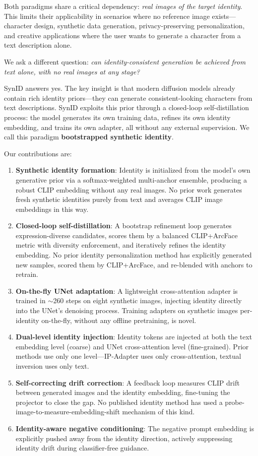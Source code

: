 \documentclass[10pt,twocolumn]{article}
\begin{document}
Both paradigms share a critical dependency: \textit{real images of the target identity}. This limits their applicability in scenarios where no reference image exists---character design, synthetic data generation, privacy-preserving personalization, and creative applications where the user wants to generate a character from a text description alone.

We ask a different question: \textit{can identity-consistent generation be achieved from text alone, with no real images at any stage?}

SynID answers yes. The key insight is that modern diffusion models already contain rich identity priors---they can generate consistent-looking characters from text descriptions. SynID exploits this prior through a closed-loop self-distillation process: the model generates its own training data, refines its own identity embedding, and trains its own adapter, all without any external supervision. We call this paradigm \textbf{bootstrapped synthetic identity}.

Our contributions are:
\begin{enumerate}[leftmargin=*,topsep=2pt,itemsep=1pt]
    \item \textbf{Synthetic identity formation}: Identity is initialized from the model's own generative prior via a softmax-weighted multi-anchor ensemble, producing a robust CLIP embedding without any real images. No prior work generates fresh synthetic identities purely from text and averages CLIP image embeddings in this way.
    \item \textbf{Closed-loop self-distillation}: A bootstrap refinement loop generates expression-diverse candidates, scores them by a balanced CLIP+ArcFace metric with diversity enforcement, and iteratively refines the identity embedding. No prior identity personalization method has explicitly generated new samples, scored them by CLIP+ArcFace, and re-blended with anchors to retrain.
    \item \textbf{On-the-fly UNet adaptation}: A lightweight cross-attention adapter is trained in $\sim$260 steps on eight synthetic images, injecting identity directly into the UNet's denoising process. Training adapters on synthetic images per-identity on-the-fly, without any offline pretraining, is novel.
    \item \textbf{Dual-level identity injection}: Identity tokens are injected at both the text embedding level (coarse) and UNet cross-attention level (fine-grained). Prior methods use only one level---IP-Adapter uses only cross-attention, textual inversion uses only text.
    \item \textbf{Self-correcting drift correction}: A feedback loop measures CLIP drift between generated images and the identity embedding, fine-tuning the projector to close the gap. No published identity method has used a probe-image-to-measure-embedding-shift mechanism of this kind.
    \item \textbf{Identity-aware negative conditioning}: The negative prompt embedding is explicitly pushed away from the identity direction, actively suppressing identity drift during classifier-free guidance.
\end{enumerate}
\end{document}
